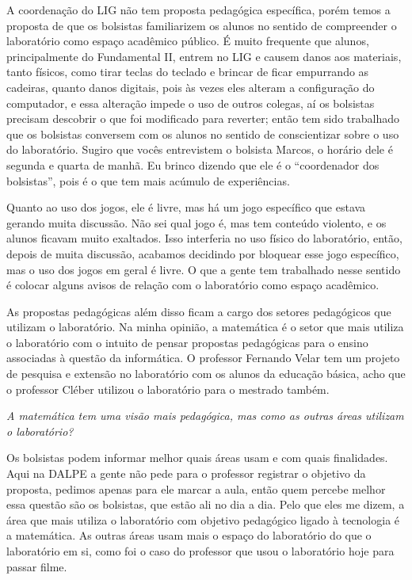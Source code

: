 A coordenação do LIG não tem proposta pedagógica específica, porém temos a proposta de que os bolsistas familiarizem os alunos no sentido de compreender o laboratório como espaço acadêmico público. É muito frequente que alunos, principalmente do Fundamental II, entrem no LIG e causem danos aos materiais, tanto físicos, como tirar teclas do teclado e brincar de ficar empurrando as cadeiras, quanto danos digitais, pois às vezes eles alteram a configuração do computador, e essa alteração impede o uso de outros colegas, aí os bolsistas precisam descobrir o que foi modificado para reverter; então tem sido trabalhado que os bolsistas conversem com os alunos no sentido de conscientizar sobre o uso do laboratório. Sugiro que vocês entrevistem o bolsista Marcos, o horário dele é segunda e quarta de manhã. Eu brinco dizendo que ele é o “coordenador dos bolsistas”, pois é o que tem mais acúmulo de experiências.

Quanto ao uso dos jogos, ele é livre, mas há um jogo específico que estava gerando muita discussão. Não sei qual jogo é, mas tem conteúdo violento, e os alunos ficavam muito exaltados. Isso interferia no uso físico do laboratório, então, depois de muita discussão, acabamos decidindo por bloquear esse jogo específico, mas o uso dos jogos em geral é livre. O que a gente tem trabalhado nesse sentido é colocar alguns avisos de relação com o laboratório como espaço acadêmico.

As propostas pedagógicas além disso ficam a cargo dos setores pedagógicos que utilizam o laboratório. Na minha opinião, a matemática é o setor que mais utiliza o laboratório com o intuito de pensar propostas pedagógicas para o ensino associadas à questão da informática. O professor Fernando Velar tem um projeto de pesquisa e extensão no laboratório com os alunos da educação básica, acho que o professor Cléber utilizou o laboratório para o mestrado também.

\textit{A matemática tem uma visão mais pedagógica, mas como as outras áreas utilizam o laboratório?}

Os bolsistas podem informar melhor quais áreas usam e com quais finalidades. Aqui na DALPE a gente não pede para o professor registrar o objetivo da proposta, pedimos apenas para ele marcar a aula, então quem percebe melhor essa questão são os bolsistas, que estão ali no dia a dia. Pelo que eles me dizem, a área que mais utiliza o laboratório com objetivo pedagógico ligado à tecnologia é a matemática. As outras áreas usam mais o espaço do laboratório do que o laboratório em si, como foi o caso do professor que usou o laboratório hoje para passar filme.

